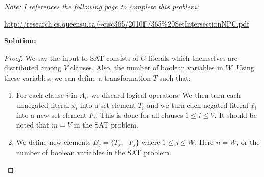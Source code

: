 \documentclass[11pt]{article}
\begin{document}
\begin{enumerate}[1]
\textit{Note: I references the following page to complete this problem:}

\url{http://research.cs.queensu.ca/~cisc365/2010F/365%20SetIntersectionNPC.pdf}

\textbf{Solution: }
\begin{proof}

We say the input to SAT consists of $U$ literals which themselves are distributed among $V$ clauses.  Also, the number of boolean variables in $W$.  Using these variables, we can define a transformation $T$ such that:

\begin{enumerate}
\item For each clause $i$ in $A_i$, we discard logical operators.  We then turn each unnegated literal $x_i$ into a set element $T_i$ and we turn each negated literal $\overline{x_i}$ into a new set element $F_i$.  This is done for all clauses $1 \leq i \leq V$.  It should be noted that $m=V$ in the SAT problem.  

\item We define new elements $B_j = \{ T_j, \text{ } F_j \}$ where $1 \leq j \leq W$.  Here $n=W$, or the number of boolean variables in the SAT problem.  

\end{enumerate}

\end{proof}

\end{enumerate}
\end{document}
